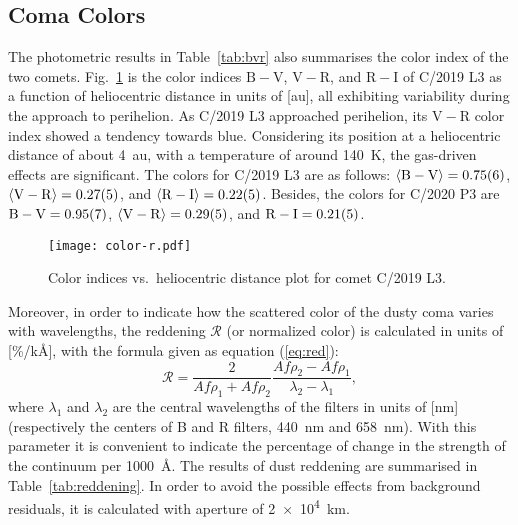 


\subsection{Coma Colors}

The photometric results in Table~\ref{tab:bvr} also summarises the color index of the two comets. 
Fig.~\ref{fig:color-r} is the color indices $\mathrm{B}-\mathrm{V}$, $\mathrm{V}-\mathrm{R}$, and $\mathrm{R}-\mathrm{I}$ of C/2019 L3 as a function of heliocentric distance in units of [\unit{\astronomicalunit}], all exhibiting variability during the approach to perihelion. 
As C/2019 L3 approached perihelion, its $\mathrm{V}-\mathrm{R}$ color index showed a tendency towards blue. 
Considering its position at a heliocentric distance of about {\SI{4}{\astronomicalunit}}, with a temperature of around {\SI{140}{\K}}, the gas-driven effects are significant. 
The colors for C/2019 L3 are as follows: 
$\langle \mathrm{B} - \mathrm{V} \rangle = \num{0.75 +- 0.06}$, 
$\langle \mathrm{V} - \mathrm{R} \rangle = \num{0.27 +- 0.05}$, and 
$\langle \mathrm{R} - \mathrm{I} \rangle = \num{0.22 +- 0.05}$. 
Besides, the colors for C/2020 P3 are 
$\mathrm{B} - \mathrm{V} = \num{0.95 +- 0.07}$, 
$\langle \mathrm{V} - \mathrm{R} \rangle = \num{0.29 +- 0.05}$, and 
$\mathrm{R} - \mathrm{I} = \num{0.21 +- 0.05}$. 

\begin{figure}
    \centering
    \texttt{[image: color-r.pdf]} 
    \caption{Color indices vs.\ heliocentric distance plot for comet C/2019 L3.}\label{fig:color-r}
\end{figure}

Moreover, in order to indicate how the scattered color of the dusty coma varies with wavelengths, the reddening $\mathcal{R}$ (or normalized color) \citep{jewitt_cometary_1986, lara_behaviour_2003, mazzotta_epifani_dust_2011, shi_ccd_2015} is calculated in units of [\si{\percent/\kilo\angstrom}], with the formula given as equation (\ref{eq:red}): 
\begin{equation}
\mathcal{R} = \frac{2}{Af\rho_1 + Af\rho_2} \frac{Af\rho_2 - Af\rho_1}{\lambda_2 - \lambda_1}, 
\label{eq:red}
\end{equation}
where $\lambda_1$ and $\lambda_2$ are the central wavelengths of the filters in units of [\unit{\nm}] (respectively the centers of B and R filters, {\SI{440}{\nm}} and {\SI{658}{\nm}}). With this parameter it is convenient to indicate the percentage of change in the strength of the continuum per {\SI{1000}{\angstrom}}. The results of dust reddening are summarised in Table~\ref{tab:reddening}. In order to avoid the possible effects from background residuals, it is calculated with aperture of {\SI{2e4}{\km}}. 

